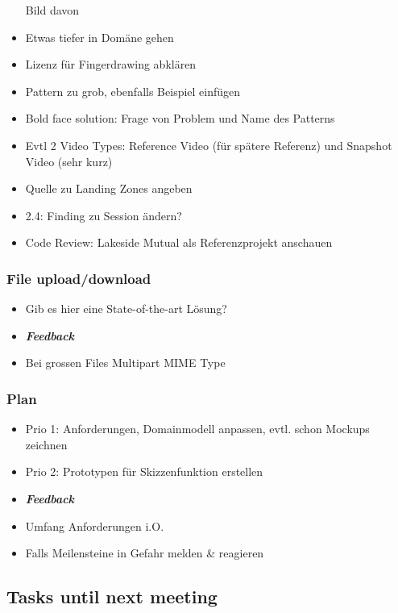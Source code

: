 \begin{itemize}
  Bild davon
\item
  Etwas tiefer in Domäne gehen
\item
  Lizenz für Fingerdrawing abklären
\item
  Pattern zu grob, ebenfalls Beispiel einfügen
\item
  Bold face solution: Frage von Problem und Name des Patterns
\item
  Evtl 2 Video Types: Reference Video (für spätere Referenz) und
  Snapshot Video (sehr kurz)
\item
  Quelle zu Landing Zones angeben
\item
  2.4: Finding zu Session ändern?
\item
  Code Review: Lakeside Mutual als Referenzprojekt anschauen
\end{itemize}

\hypertarget{file-uploaddownload}{%
\subsubsection*{File upload/download}\label{file-uploaddownload}}

\begin{itemize}

\item
  Gib es hier eine State-of-the-art Lösung? 
\item \emph{\textbf{Feedback}}
\item
  Bei grossen Files Multipart MIME Type
\end{itemize}

\hypertarget{plan}{%
\subsubsection*{Plan}\label{plan}}

\begin{itemize}

\item
  Prio 1: Anforderungen, Domainmodell anpassen, evtl. schon Mockups zeichnen
\item
  Prio 2: Prototypen für Skizzenfunktion erstellen
\item \emph{\textbf{Feedback}}
\item
  Umfang Anforderungen i.O.
\item
  Falls Meilensteine in Gefahr melden \& reagieren
\end{itemize}

\hypertarget{tasks-until-next-meeting}{%
\subsection*{Tasks until next meeting}\label{tasks-until-next-meeting}}

